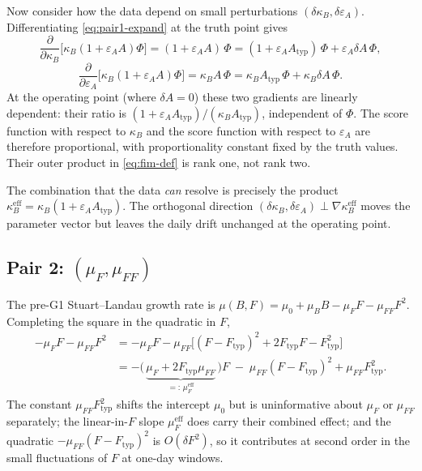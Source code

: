 Now consider how the data depend on small perturbations
$(\delta\kappa_B,\delta\varepsilon_A)$. Differentiating
\eqref{eq:pair1-expand} at the truth point gives
\begin{equation*}
  \frac{\partial}{\partial \kappa_B}\bigl[\kappa_B(1+\varepsilon_A A)\Phi\bigr]
   = (1+\varepsilon_A A)\,\Phi
   = (1+\varepsilon_A A_{\mathrm{typ}})\,\Phi + \varepsilon_A \delta A\,\Phi,
\end{equation*}
\begin{equation*}
  \frac{\partial}{\partial \varepsilon_A}\bigl[\kappa_B(1+\varepsilon_A A)\Phi\bigr]
   = \kappa_B A\,\Phi
   = \kappa_B A_{\mathrm{typ}}\,\Phi + \kappa_B \delta A\,\Phi.
\end{equation*}
At the operating point (where $\delta A = 0$) these two gradients
are linearly dependent: their ratio is
$(1+\varepsilon_A A_{\mathrm{typ}})/(\kappa_B A_{\mathrm{typ}})$,
independent of $\Phi$. The score function with respect to
$\kappa_B$ and the score function with respect to $\varepsilon_A$
are therefore proportional, with proportionality constant fixed by
the truth values. Their outer product in \eqref{eq:fim-def} is rank
one, not rank two.

The combination that the data \emph{can} resolve is precisely the
product $\kappa_B^{\mathrm{eff}} = \kappa_B(1+\varepsilon_A A_{\mathrm{typ}})$.
The orthogonal direction
$(\delta\kappa_B, \delta\varepsilon_A) \perp \nabla \kappa_B^{\mathrm{eff}}$
moves the parameter vector but leaves the daily drift unchanged at
the operating point.

\subsection{Pair 2: \texorpdfstring{$(\mu_F, \mu_{FF})$}{(mu\_F, mu\_FF)}}\label{app:fim-pair2}

The pre-G1 Stuart--Landau growth rate is
$\mu(B,F) = \mu_0 + \mu_B B - \mu_F F - \mu_{FF} F^2$. Completing
the square in the quadratic in $F$,
\begin{align}
  -\mu_F F - \mu_{FF} F^2
  &= -\mu_F F - \mu_{FF}\bigl[(F-F_{\mathrm{typ}})^2 + 2 F_{\mathrm{typ}} F - F_{\mathrm{typ}}^2\bigr]
       \nonumber\\
  &= -\bigl(\,\underbrace{\mu_F + 2 F_{\mathrm{typ}} \mu_{FF}}_{=:\,\mu_F^{\mathrm{eff}}}\,\bigr) F
     \;-\; \mu_{FF}(F-F_{\mathrm{typ}})^2 + \mu_{FF} F_{\mathrm{typ}}^2.
  \label{eq:pair2-expand}
\end{align}
The constant $\mu_{FF} F_{\mathrm{typ}}^2$ shifts the intercept
$\mu_0$ but is uninformative about $\mu_F$ or $\mu_{FF}$ separately;
the linear-in-$F$ slope $\mu_F^{\mathrm{eff}}$ does carry their
combined effect; and the quadratic
$-\mu_{FF}(F-F_{\mathrm{typ}})^2$ is $O(\delta F^2)$, so it
contributes at second order in the small fluctuations of $F$ at
one-day windows.

